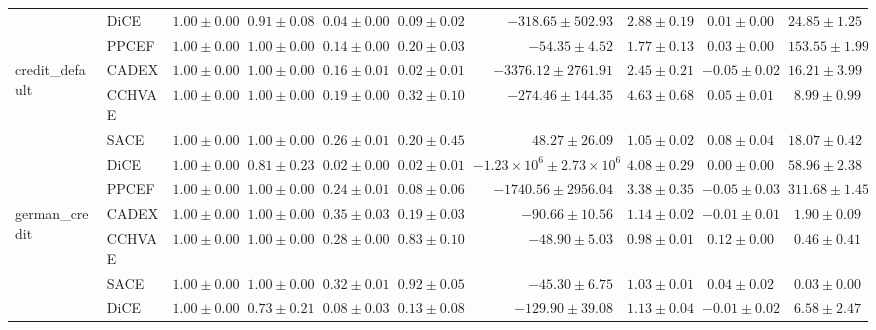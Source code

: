 \begin{table}[ht]
\begin{center}
\begin{sc}
\begin{scriptsize}
\begin{tabular}{l|l|rrrrrrrr}
 & DiCE & $\boldsymbol{1.00\pm{0.00}}$ & $0.91\pm{0.08}$ & $0.04\pm{0.00}$ & $0.09\pm{0.02}$ & $-318.65\pm{502.93}$ & $2.88\pm{0.19}$ & $0.01\pm{0.00}$ & $24.85\pm{1.25}$ \\
 & PPCEF & $\boldsymbol{1.00\pm{0.00}}$ & $\boldsymbol{1.00\pm{0.00}}$ & $0.14\pm{0.00}$ & $0.20\pm{0.03}$ & $-54.35\pm{4.52}$ & $1.77\pm{0.13}$ & $0.03\pm{0.00}$ & $153.55\pm{1.99}$ \\
\midrule
\multirow{5}{*}{credit\_default} & CADEX & $\boldsymbol{1.00\pm{0.00}}$ & $\boldsymbol{1.00\pm{0.00}}$ & $0.16\pm{0.01}$ & $0.02\pm{0.01}$ & $-3376.12\pm{2761.91}$ & $2.45\pm{0.21}$ & $-0.05\pm{0.02}$ & $16.21\pm{3.99}$ \\
 & CCHVAE & $\boldsymbol{1.00\pm{0.00}}$ & $\boldsymbol{1.00\pm{0.00}}$ & $0.19\pm{0.00}$ & $\boldsymbol{0.32\pm{0.10}}$ & $-274.46\pm{144.35}$ & $4.63\pm{0.68}$ & $0.05\pm{0.01}$ & $\boldsymbol{8.99\pm{0.99}}$ \\
 & SACE & $\boldsymbol{1.00\pm{0.00}}$ & $\boldsymbol{1.00\pm{0.00}}$ & $\boldsymbol{0.26\pm{0.01}}$ & $0.20\pm{0.45}$ & $\boldsymbol{48.27\pm{26.09}}$ & $\boldsymbol{1.05\pm{0.02}}$ & $\boldsymbol{0.08\pm{0.04}}$ & $18.07\pm{0.42}$ \\
 & DiCE & $\boldsymbol{1.00\pm{0.00}}$ & $0.81\pm{0.23}$ & $0.02\pm{0.00}$ & $0.02\pm{0.01}$ & $-1.23\times 10^{6}\pm{2.73\times 10^{6}}$ & $4.08\pm{0.29}$ & $0.00\pm{0.00}$ & $58.96\pm{2.38}$ \\
 & PPCEF & $\boldsymbol{1.00\pm{0.00}}$ & $\boldsymbol{1.00\pm{0.00}}$ & $0.24\pm{0.01}$ & $0.08\pm{0.06}$ & $-1740.56\pm{2956.04}$ & $3.38\pm{0.35}$ & $-0.05\pm{0.03}$ & $311.68\pm{1.45}$ \\
\midrule
\multirow{5}{*}{german\_credit} & CADEX & $\boldsymbol{1.00\pm{0.00}}$ & $\boldsymbol{1.00\pm{0.00}}$ & $\boldsymbol{0.35\pm{0.03}}$ & $0.19\pm{0.03}$ & $-90.66\pm{10.56}$ & $1.14\pm{0.02}$ & $-0.01\pm{0.01}$ & $1.90\pm{0.09}$ \\
 & CCHVAE & $\boldsymbol{1.00\pm{0.00}}$ & $\boldsymbol{1.00\pm{0.00}}$ & $0.28\pm{0.00}$ & $0.83\pm{0.10}$ & $-48.90\pm{5.03}$ & $\boldsymbol{0.98\pm{0.01}}$ & $\boldsymbol{0.12\pm{0.00}}$ & $0.46\pm{0.41}$ \\
 & SACE & $\boldsymbol{1.00\pm{0.00}}$ & $\boldsymbol{1.00\pm{0.00}}$ & $0.32\pm{0.01}$ & $\boldsymbol{0.92\pm{0.05}}$ & $\boldsymbol{-45.30\pm{6.75}}$ & $1.03\pm{0.01}$ & $0.04\pm{0.02}$ & $\boldsymbol{0.03\pm{0.00}}$ \\
 & DiCE & $\boldsymbol{1.00\pm{0.00}}$ & $0.73\pm{0.21}$ & $0.08\pm{0.03}$ & $0.13\pm{0.08}$ & $-129.90\pm{39.08}$ & $1.13\pm{0.04}$ & $-0.01\pm{0.02}$ & $6.58\pm{2.47}$ \\

\end{tabular}
\end{scriptsize}
\end{sc}
\end{center}
\end{table}
